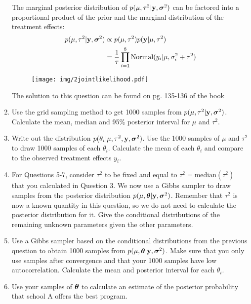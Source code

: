 \documentclass[12pt]{article}
\def\y{\mathbf{y}}
\newcommand{\si}{\mbox{\boldmath $\sigma$}}
\newcommand{\bth}{\mbox{\boldmath $\theta$}}
\begin{document}
\begin{enumerate}
	The marginal posterior distribution of $p(\mu,\tau^2|\y,\si^2)$ can be factored into a proportional product of the prior and the marginal distribution of the treatment effects:
		\begin{align*}
			p(\mu,\tau^2|\y, \si^2) & \propto p(\mu,\tau^2) p(\y | \mu,\tau^2) \\
			& = \frac{1}{\tau} \prod_{i=1}^8 \mbox{Normal}(y_i | \mu, \sigma_{i}^2 + \tau^2)
		\end{align*}
	
	\begin{figure}[h]
		\centering
			\texttt{[image: img/2jointlikelihood.pdf]}
	\end{figure}
	
	The solution to this question can be found on pg. 135-136 of the book
	
	\item Use the grid sampling method to get 1000 samples from $p(\mu,\tau^2|\y,\si^2)$. Calculate the mean, median and 95\% posterior interval for $\mu$ and $\tau^2$.
	
	\item Write out the distribution $p(\theta_i|\mu,\tau^2,\y,\si^2)$. Use the 1000 samples of $\mu$ and $\tau^2$ to draw 1000 samples of each $\theta_i$. Calculate the mean of each $\theta_i$ and compare to the observed treatment effects $y_i$.
	
	\item For Questions 5-7, consider $\tau^2$ to be fixed and equal to $\tau^2 = \mbox{median}(\tau^2)$ that you calculated in Question 3. We now use a Gibbs sampler to draw samples from the posterior distribution $p(\mu,\bth|\y,\si^2)$. Remember that $\tau^2$ is now a known quantity in this question, so we do not need to calculate the posterior distribution for it. Give the conditional distributions of the remaining unknown parameters given the other parameters.
	
	\item Use a Gibbs sampler based on the conditional distributions from the previous question to obtain 1000 samples from $p(\mu,\bth|\y,\si^2)$. Make sure that you only use samples after convergence and that your 1000 samples have low autocorrelation. Calculate the mean and posterior interval for each $\theta_i$.
	
	\item Use your samples of $\bth$ to calculate an estimate of the posterior probability that school A offers the best program.
	

\end{enumerate}
\end{document}
